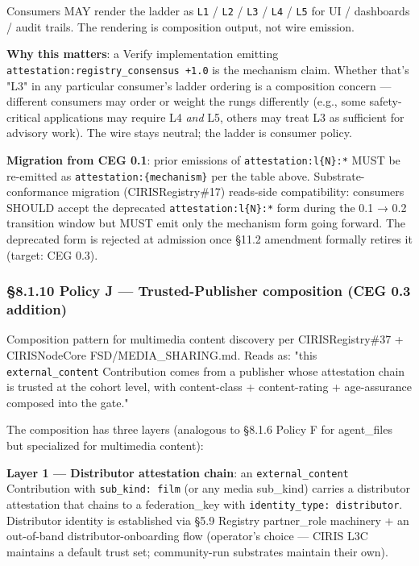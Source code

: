 \documentclass[10pt]{article}
\begin{document}
Consumers MAY render the ladder as \texttt{L1} / \texttt{L2} / \texttt{L3} / \texttt{L4} / \texttt{L5} for UI / dashboards / audit trails. The rendering is composition output, not wire emission.


\textbf{Why this matters}: a Verify implementation emitting \texttt{attestation:registry\_consensus +1.0} is the mechanism claim. Whether that's "L3" in any particular consumer's ladder ordering is a composition concern — different consumers may order or weight the rungs differently (e.g., some safety-critical applications may require L4 \textit{and} L5, others may treat L3 as sufficient for advisory work). The wire stays neutral; the ladder is consumer policy.


\textbf{Migration from CEG 0.1}: prior emissions of \texttt{attestation:l\{N\}:*} MUST be re-emitted as \texttt{attestation:\{mechanism\}} per the table above. Substrate-conformance migration (CIRISRegistry\#17) reads-side compatibility: consumers SHOULD accept the deprecated \texttt{attestation:l\{N\}:*} form during the 0.1 → 0.2 transition window but MUST emit only the mechanism form going forward. The deprecated form is rejected at admission once §11.2 amendment formally retires it (target: CEG 0.3).


\subsubsection*{§8.1.10 Policy J — Trusted-Publisher composition (CEG 0.3 addition)}


Composition pattern for multimedia content discovery per CIRISRegistry\#37 + CIRISNodeCore FSD/MEDIA\_SHARING.md. Reads as: "this \texttt{external\_content} Contribution comes from a publisher whose attestation chain is trusted at the cohort level, with content-class + content-rating + age-assurance composed into the gate."


The composition has three layers (analogous to §8.1.6 Policy F for agent\_files but specialized for multimedia content):


\textbf{Layer 1 — Distributor attestation chain}: an \texttt{external\_content} Contribution with \texttt{sub\_kind: film} (or any media sub\_kind) carries a distributor attestation that chains to a federation\_key with \texttt{identity\_type: distributor}. Distributor identity is established via §5.9 Registry partner\_role machinery + an out-of-band distributor-onboarding flow (operator's choice — CIRIS L3C maintains a default trust set; community-run substrates maintain their own).
\end{document}
